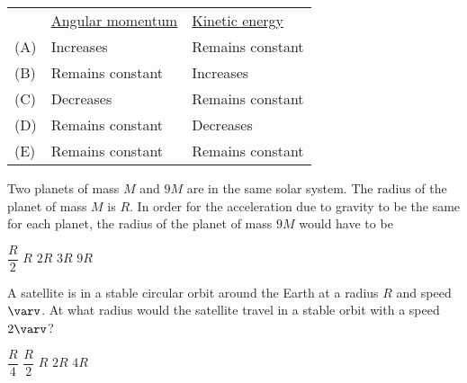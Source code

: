 \documentclass{../../../oss-apphys-exam}
\begin{document}
\begin{multicols*}{2}
\begin{questions}
    \begin{tabular}{lll}
      & \underline{Angular momentum} & \underline{Kinetic energy}\\
      (A) & Increases & Remains constant \\
      (B) & Remains constant & Increases \\
      (C) & Decreases & Remains constant \\
      (D) & Remains constant & Decreases \\
      (E) & Remains constant & Remains constant
    \end{tabular}
    \vspace{.7in}
    
    \question Two planets of mass $M$ and $9M$ are in the same solar system. The
    radius of the planet of mass $M$ is $R$. In order for the acceleration due
    to gravity to be the same for each planet, the radius of the planet of mass
    $9M$ would have to be
    \begin{choices}
      \choice $\dfrac{R}2$
      \choice $R$
      \choice $2R$
      \choice $3R$
      \choice $9R$
    \end{choices}
    
    \question A satellite is in a stable circular orbit around the Earth at a
    radius $R$ and speed $\varv$. At what radius would the satellite travel in
    a stable orbit with a speed $2\varv$?
    \begin{choices}
      \choice $\dfrac{R}4$
      \choice $\dfrac{R}2$
      \choice $R$
      \choice $2R$
      \choice $4R$
    \end{choices}

    

\end{questions}
\end{multicols*}
\end{document}
